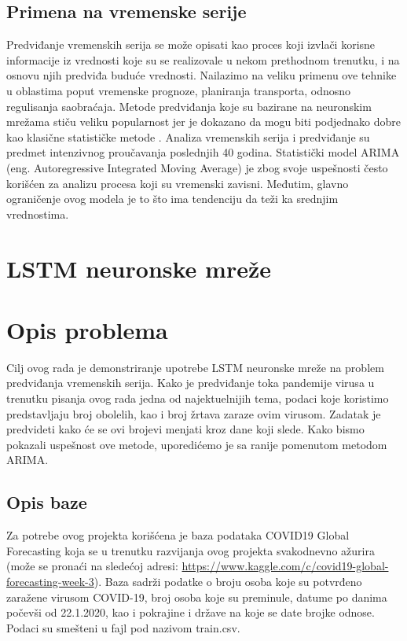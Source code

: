 \documentclass[a4paper]{article}
\begin{document}
\subsection{Primena na vremenske serije}
Predviđanje vremenskih serija se može opisati kao proces koji izvlači korisne informacije iz vrednosti koje su se realizovale u nekom prethodnom trenutku, i na osnovu njih predviđa buduće vrednosti. Nailazimo na veliku primenu ove tehnike u oblastima poput vremenske prognoze, planiranja transporta, odnosno regulisanja saobraćaja. Metode predviđanja koje su bazirane na neuronskim mrežama stiču veliku popularnost jer je dokazano da mogu biti podjednako dobre kao klasične statističke metode \cite{siami2018forecasting}. 
Analiza vremenskih serija i predviđanje su predmet intenzivnog proučavanja poslednjih 40 godina. Statistički model ARIMA (eng. Autoregressive Integrated Moving Average) je zbog svoje uspešnosti često korišćen za analizu procesa koji su vremenski zavisni. Međutim, glavno ograničenje ovog modela je to što ima tendenciju da teži ka srednjim vrednostima. 

\section{LSTM neuronske mreže}


\section{Opis problema}
Cilj ovog rada je demonstriranje upotrebe LSTM neuronske mreže na problem predviđanja vremenskih serija. Kako je predviđanje toka pandemije virusa u trenutku pisanja ovog rada jedna od najektuelnijih tema, podaci koje koristimo predstavljaju broj obolelih, kao i broj žrtava zaraze ovim virusom. Zadatak je predvideti kako će se ovi brojevi menjati kroz dane koji slede. Kako bismo pokazali uspešnost ove metode, uporedićemo je sa ranije pomenutom metodom ARIMA. 

\subsection{Opis baze}
Za potrebe ovog projekta korišćena je baza podataka COVID19 Global Forecasting koja se u trenutku razvijanja ovog projekta svakodnevno ažurira (može se pronaći na sledećoj adresi: \url{https://www.kaggle.com/c/covid19-global-forecasting-week-3}). Baza sadrži podatke o broju osoba koje su potvrđeno zaražene virusom COVID-19, broj osoba koje su preminule, datume po danima počevši od 22.1.2020, kao i pokrajine i države na koje se date brojke odnose. Podaci su smešteni u fajl pod nazivom train.csv. 
\end{document}
